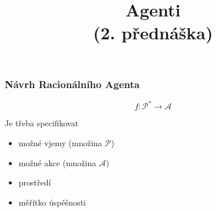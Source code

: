 \documentclass[red,professionalfont]{beamer}
\title[]{Agenti \\ (2. přednáška)}
\date[]{}
\theoremstyle{definition}
\newcommand{\0}{\mbox{${\bf 0}$}}
\begin{document}



\begin{frame}{} \titlepage
\end{frame}

\begin{frame}\frametitle{Návrh Racionálního Agenta}
\begin{block}{}
\begin{displaymath}
 f: {\mathcal P}^* \to {\mathcal A}
\end{displaymath}\pause
\begin{center}
 Je třeba specifikovat
\end{center}\pause
\end{block}
\begin{itemize}
 \item možné vjemy (množina $\mathcal P$)\pause
 \item možné akce (množina $\mathcal A$)\pause
 \item \alert{prostředí}\pause
 \item měřítko úspěšnosti
\end{itemize}
\end{frame}
\end{document}
